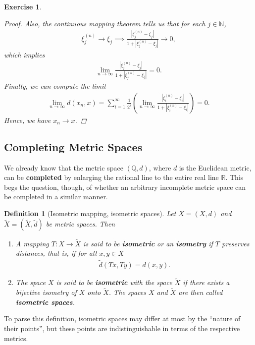\documentclass[11pt]{article}
\theoremstyle{mystyle}
\newtheorem{defn}{Definition}[section]
\newtheorem{protoexer}{Exercise}[section]
\newenvironment{exer}
{\colorlet{shadecolor}{blue!15}\begin{shaded}\begin{protoexer}}
{\end{protoexer}\end{shaded}}
\begin{document}
\begin{exer}
\begin{proof}
Also, the continuous mapping theorem tells us that for each $j \in \mathbb{N}$,
\begin{align*}
    \xi_j^{(n)} \longrightarrow \xi_j \implies \frac{|\xi_j^{(n)} - \xi_j|}{1 + |\xi_j^{(n)}- \xi_j|} \longrightarrow 0,
\end{align*}
which implies
\begin{align*}
    \lim_{n \to \infty} \frac{|\xi_j^{(n)} - \xi_j|}{1 + |\xi_j^{(n)}- \xi_j|} = 0.
\end{align*}
Finally, we can compute the limit
\begin{align*}
    \lim_{n \to \infty} d(x_n, x) = \sum_{i=1}^{\infty} \frac{1}{2^i} \left( \lim_{n \to \infty}\frac{|\xi_i^{(n)} - \xi_i|}{1 + |\xi_i^{(n)} - \xi_i|} \right) = 0. 
\end{align*}
Hence, we have $x_n \longrightarrow x$.
\end{proof}
\end{exer}

\subsection{Completing Metric Spaces}
We already know that the metric space $(\mathbb{Q}, d)$, where $d$ is the Euclidean metric, can be \textbf{completed} by enlarging the rational line to the entire real line $\mathbb{R}$. This begs the question, though, of whether an arbitrary incomplete metric space can be completed in a similar manner.

\begin{defn}[Isometric mapping, isometric spaces]
Let $X = (X, d)$ and $\tilde{X} = (\tilde{X}, \tilde{d})$ be metric spaces. Then
\begin{enumerate}
    \item A mapping $T: X \longrightarrow \tilde{X}$ is said to be \textbf{isometric} or an \textbf{isometry} if $T$ preserves distances, that is, if for all $x, y \in X$
    \begin{align*}
        \tilde{d}(Tx, Ty) = d(x, y).
    \end{align*}
    \item The space $X$ is said to be \textbf{isometric} with the space $\tilde{X}$ if there exists a bijective isometry of $X$ onto $\tilde{X}$. The spaces $X$ and $\tilde{X}$ are then called \textbf{isometric spaces}.
\end{enumerate}
\end{defn}
To parse this definition, isometric spaces may differ at most by the \enquote{nature of their points}, but these points are indistinguishable in terms of the respective metrics. 
\end{document}
